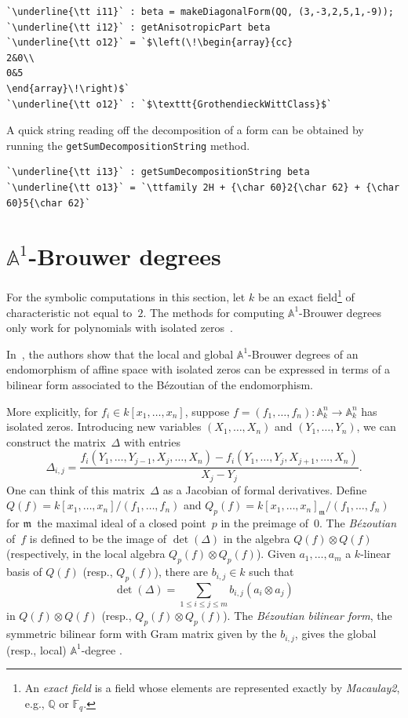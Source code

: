 \documentclass[12pt]{amsart}
\theoremstyle{definition}
\providecommand{\A}{\mathbb{A}}
\begin{document}
\begin{lstlisting}[language=Macaulay2output]
`\underline{\tt i11}` : beta = makeDiagonalForm(QQ, (3,-3,2,5,1,-9));
`\underline{\tt i12}` : getAnisotropicPart beta
`\underline{\tt o12}` = `$\left(\!\begin{array}{cc}
2&0\\
0&5
\end{array}\!\right)$`
`\underline{\tt o12}` : `$\texttt{GrothendieckWittClass}$`
\end{lstlisting}

A quick string reading off the decomposition of a form can be obtained by running the \texttt{getSumDecompositionString} method.
\begin{lstlisting}[language=Macaulay2output]
`\underline{\tt i13}` : getSumDecompositionString beta
`\underline{\tt o13}` = `\ttfamily 2H + {\char 60}2{\char 62} + {\char 60}5{\char 62}`
\end{lstlisting}

\section{\texorpdfstring{$\A^1$}{A\textonesuperior}-Brouwer degrees}\label{sec:A1Degs}

For the symbolic computations in this section, let $k$ be an exact field\footnote{An \emph{exact field} is a field whose elements are represented exactly by \emph{Macaulay2}, e.g., $\mathbb{Q}$ or $\mathbb{F}_q$.} of characteristic not equal to~$2$. The methods for computing $\mathbb{A}^{1}$-Brouwer degrees only work for polynomials with isolated zeros~\cite[Theorem~1.2]{BMP}.

In~\cite{BMP}, the authors show that the local and global $\mathbb{A}^{1}$-Brouwer degrees of an endomorphism of affine space with isolated zeros can be expressed in terms of a bilinear form associated to the B\'{e}zoutian of the endomorphism.

More explicitly, for $f_{i}\in k[x_{1},\dots,x_{n}]$, suppose $f=(f_{1},\dots,f_{n})\colon\mathbb{A}^{n}_{k}\to\mathbb{A}^{n}_{k}$ has isolated zeros. Introducing new variables $(X_{1},\dots,X_{n})$ and $(Y_{1},\dots, Y_{n})$, we can construct the matrix~$\Delta$ with entries 
\[
\Delta_{i,j}=\frac{f_{i}(Y_{1},\dots,Y_{j-1},X_{j},\dots,X_{n})-f_{i}(Y_{1},\dots,Y_{j},X_{j+1},\dots,X_{n})}{X_{j}-Y_{j}}.
\]
One can think of this matrix~$\Delta$ as a Jacobian of formal derivatives. Define $Q(f)=k[x_{1},\dots,x_{n}]/(f_{1},\dots,f_{n})$ and $Q_{p}(f)=k[x_{1},\dots,x_{n}]_{\mathfrak{m}}/(f_{1},\dots,f_{n})$ for $\mathfrak{m}$~the maximal ideal of a closed point~$p$ in the preimage of~$0$. The \emph{B\'{e}zoutian} of~$f$ is defined to be the image of $\det(\Delta)$ in the algebra $Q(f)\otimes Q(f)$ (respectively, in the local algebra $Q_{p}(f)\otimes Q_{p}(f)$). Given $a_{1},\dots,a_{m}$ a $k$-linear basis of $Q(f)$ (resp., $Q_{p}(f)$), there are $b_{i,j}\in k$ such that 
\[
\det(\Delta)=\sum_{1\leq i\leq j\leq m}b_{i,j}(a_{i}\otimes a_{j})
\]
in $Q(f)\otimes Q(f)$ (resp., $Q_{p}(f)\otimes Q_{p}(f)$). The \emph{B\'{e}zoutian bilinear form}, the symmetric bilinear form with Gram matrix given by the $b_{i,j}$, gives the global (resp., local) $\mathbb{A}^{1}$-degree \cite[Theorem~1.2]{BMP}. 
\end{document}
